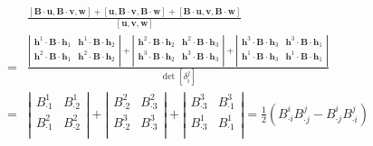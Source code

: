 \documentclass[UTF8,zihao=5]{ctexart}
\newcommand{\bm}[1]{{\mathbf{#1}}}
\begin{document}
\begin{equation}
    \begin{aligned}
          & \frac{
        [\bm{B}\cdot\bm{u}, \bm{B}\cdot\bm{v}, \bm{w}]+
        [\bm{u}, \bm{B}\cdot\bm{v}, \bm{B}\cdot\bm{w}]+
        [\bm{B}\cdot\bm{u}, \bm{v}, \bm{B}\cdot\bm{w}]}{[\bm{u}, \bm{v}, \bm{w}]}
        \\
        = &
        \frac{
            \left|
            \begin{matrix}
                \bm{h}^1\cdot\bm{B}\cdot\bm{h}_1 & \bm{h}^1\cdot\bm{B}\cdot\bm{h}_2 \\
                \bm{h}^2\cdot\bm{B}\cdot\bm{h}_1 & \bm{h}^2\cdot\bm{B}\cdot\bm{h}_2 \\
            \end{matrix}
            \right|
            +
            \left|
            \begin{matrix}
                \bm{h}^2\cdot\bm{B}\cdot\bm{h}_2 & \bm{h}^2\cdot\bm{B}\cdot\bm{h}_3 \\
                \bm{h}^3\cdot\bm{B}\cdot\bm{h}_2 & \bm{h}^3\cdot\bm{B}\cdot\bm{h}_3 \\
            \end{matrix}
            \right|
            +
            \left|
            \begin{matrix}
                \bm{h}^3\cdot\bm{B}\cdot\bm{h}_3 & \bm{h}^3\cdot\bm{B}\cdot\bm{h}_1 \\
                \bm{h}^1\cdot\bm{B}\cdot\bm{h}_3 & \bm{h}^1\cdot\bm{B}\cdot\bm{h}_1 \\
            \end{matrix}
            \right|
        }{\det{[\delta_i^j]}} \\
        = &
        \left|
        \begin{matrix}
            B^1_{\cdot1} & B^1_{\cdot2} \\
            B^2_{\cdot1} & B^2_{\cdot2} \\
        \end{matrix}
        \right|
        +
        \left|
        \begin{matrix}
            B^2_{\cdot2} & B^2_{\cdot3} \\
            B^3_{\cdot2} & B^3_{\cdot3} \\
        \end{matrix}
        \right|
        +
        \left|
        \begin{matrix}
            B^3_{\cdot3} & B^3_{\cdot1} \\
            B^1_{\cdot3} & B^1_{\cdot1} \\
        \end{matrix}
        \right|
        =\frac{1}{2}\left(B^i_{\cdot i}B^j_{\cdot j}-B^i_{\cdot j}B^j_{\cdot i}\right)
    \end{aligned}
\end{equation}
\end{document}
